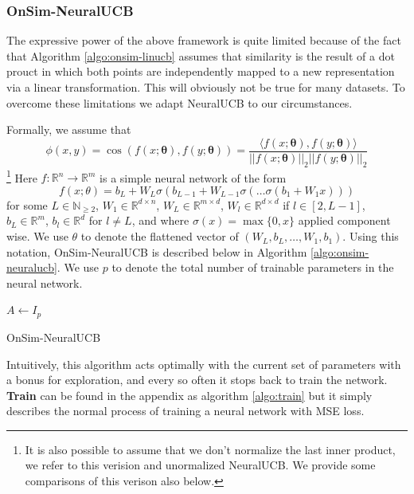 \documentclass{article}
\begin{document}
\subsubsection{OnSim-NeuralUCB}
The expressive power of the above framework is quite limited because of the fact that Algorithm \ref{algo:onsim-linucb} assumes that similarity is the result
of a dot prouct in which both points are independently mapped to a new representation via a linear transformation. This will obviously not be true for many datasets.
To overcome these limitations we adapt NeuralUCB \cite{neuralucb} to our circumstances.

Formally, we assume that
\[ \phi(x,y) = \cos\left(f(x;\mathbf{\theta}), f(y;\mathbf{\theta})\right) = \frac{\langle f(x;\mathbf{\theta}), f(y;\mathbf{\theta}) \rangle}{||f(x;\mathbf{\theta})||_2 ||f(y;\mathbf{\theta})||_2}\]
\footnote{It is also possible to assume that we don't normalize the last inner product, we refer to this verision and unormalized NeuralUCB. We provide some comparisons of this verison also below.}
Here $f: \mathbb{R}^n \to \mathbb{R}^m$ is a simple neural network of the form
\[ f(x; \theta) = b_L + W_{L} \sigma\left(b_{L-1} +  W_{L-1} \sigma\left( \dots \sigma\left(b_1 + W_1 x\right)\right) \right)\]
for some $L \in \mathbb{N}_{\geq 2}$, $W_1 \in \mathbb{R}^{d \times n}$, $W_{L} \in \mathbb{R}^{m \times d}$, $W_{l} \in \mathbb{R}^{d\times d}$ if $l \in [2, L-1]$, $b_L \in \mathbb{R}^m$, $b_l \in \mathbb{R}^d$ for $l \neq L$, and where $\sigma(x) = \max\{0, x\}$ applied component wise. We use $\theta$ to denote the flattened vector of $(W_L, b_L, \dots, W_1, b_1)$.
Using this notation, OnSim-NeuralUCB is described below in Algorithm \ref{algo:onsim-neuralucb}. We use $p$ to denote the total number of trainable parameters in the neural network.

\begin{algorithm}
    $A \gets I_{p}$\;
    \caption{OnSim-NeuralUCB}\label{algo:onsim-neuralucb}
  \end{algorithm}
Intuitively, this algorithm acts optimally with the current set of parameters with a bonus for exploration, and every so often it stops back to train the network.
\textbf{Train} can be found in the appendix as algorithm \ref{algo:train} but it simply describes the normal process of training a neural network with MSE loss.
\end{document}
